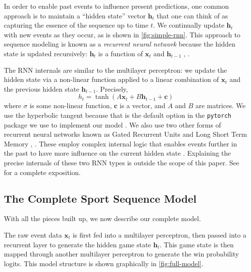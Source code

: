 In order to enable past events to influence present predictions, one common approach is to maintain a ``hidden state'' vector $\mathbf h_t$ that one can think of as capturing the essence of the sequence up to time $t$. We continually update $\mathbf h_t$ with new events as they occur, as is shown in \autoref{fig:simple-rnn}.
This approach to sequence modeling is known as a \emph{recurrent neural network} because the hidden state is updated recursively: $\mathbf h_t$ is a function of $\mathbf x_t$ and $\mathbf h_{t-1}$ \cite[\S 10.5]{ISL}, \cite[\S 15]{PML}.

The RNN internals are similar to the multilayer perceptron: we update the hidden state via a non-linear function applied to a linear combination of $\mathbf x_t$ and the previous hidden state $\mathbf h_{t-1}$. Precisely,
\begin{equation}
	\label{eqn:elman-rnn}
	h_t = \tanh (A \mathbf x_t + B \mathbf h_{t-1} + \mathbf c)
\end{equation}
where $\sigma$ is some non-linear function, $\mathbf c$ is a vector, and $A$ and $B$ are matrices. We use the hyperbolic tangent because that is the default option in the \texttt{pytorch} package we use to implement our model \cite{pytorch}. We also use two other forms of recurrent neural networks known as Gated Recurrent Units \cite[\S 15.2.7.1]{PML} and Long Short Term Memory \cite[\S 10.5.1]{ISL}, \cite[\S 15.2.7.2]{PML}. These employ complex internal logic that enables events further in the past to have more influence on the current hidden state \cite[\S 15.2.6]{PML}. Explaining the precise internals of these two RNN types is outside the scope of this paper. See \textcite[\S 15.2.7]{PML} for a complete exposition.

\subsection{The Complete Sport Sequence Model}
\label{sec:complete-model}

With all the pieces built up, we now describe our complete model.

The raw event data $\mathbf x_t$ is first fed into a multilayer perceptron, then passed into a recurrent layer to generate the hidden game state $\mathbf h_t$. This game state is then mapped through another multilayer perceptron to generate the win probability logits. This model structure is shown graphically in \autoref{fig:full-model}.

